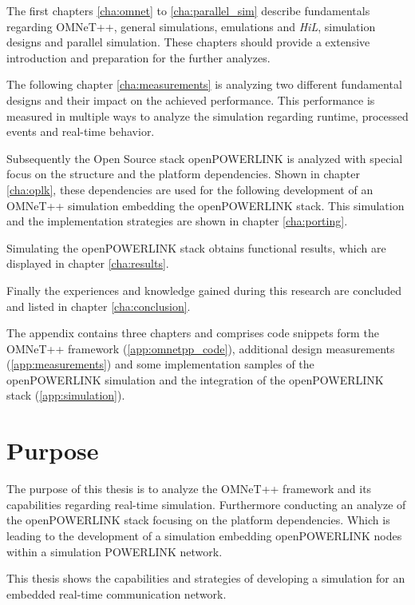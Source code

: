The first chapters \ref{cha:omnet} to \ref{cha:parallel_sim} describe fundamentals regarding OMNeT++, general simulations, emulations and \emph{HiL}, simulation designs and parallel simulation.
These chapters should provide a extensive introduction and preparation for the further analyzes.

The following chapter \ref{cha:measurements} is analyzing two different fundamental designs and their impact on the achieved performance.
This performance is measured in multiple ways to analyze the simulation regarding runtime, processed events and real-time behavior.

Subsequently the Open Source stack openPOWERLINK is analyzed with special focus on the structure and the platform dependencies.
Shown in chapter \ref{cha:oplk}, these dependencies are used for the following development of an OMNeT++ simulation embedding the openPOWERLINK stack.
This simulation and the implementation strategies are shown in chapter \ref{cha:porting}.

Simulating the openPOWERLINK stack obtains functional results, which are displayed in chapter \ref{cha:results}.

Finally the experiences and knowledge gained during this research are concluded and listed in chapter \ref{cha:conclusion}.

The appendix contains three chapters and comprises code snippets form the OMNeT++ framework (\ref{app:omnetpp_code}), additional design measurements (\ref{app:measurements}) and some implementation samples of the openPOWERLINK simulation and the integration of the openPOWERLINK stack (\ref{app:simulation}).

\section{Purpose}
The purpose of this thesis is to analyze the OMNeT++ framework and its capabilities regarding real-time simulation.
Furthermore conducting an analyze of the openPOWERLINK stack focusing on the platform dependencies.
Which is leading to the development of a simulation embedding openPOWERLINK nodes within a simulation POWERLINK network.

This thesis shows the capabilities and strategies of developing a simulation for an embedded real-time communication network.